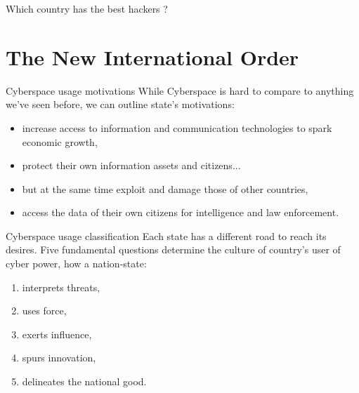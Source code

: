 \documentclass[xcolor=table]{beamer}
\begin{document}
\begin{frame}
\Huge{Which country has the best hackers ?}
\end{frame}

\section{The New International Order}
\begin{frame}{Cyberspace usage motivations}
While Cyberspace is hard to compare to anything we've seen before, we can outline state's motivations:
\begin{itemize}
\item increase access to information and communication technologies to spark economic growth,
\item protect their own information assets and citizens...
\item but at the same time exploit and damage those of other countries,
\item access the data of their own citizens for intelligence and law enforcement.
\end{itemize}
\end{frame}

\begin{frame}{Cyberspace usage classification}
Each state has a different road to reach its desires. \newline
Five fundamental questions determine the culture of country's user of cyber power,
how a nation-state:
\begin{enumerate}
\item interprets threats,
\item uses force,
\item exerts influence,
\item spurs innovation,
\item delineates the national good.
\end{enumerate}
\end{frame}
\end{document}
